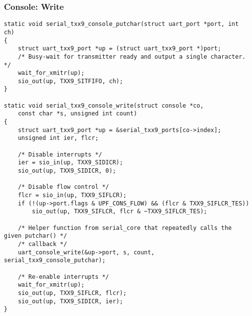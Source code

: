 \begin{frame}[fragile]
  \frametitle{Console: Write}
\begin{verbatim}
static void serial_txx9_console_putchar(struct uart_port *port, int ch)
{
	struct uart_txx9_port *up = (struct uart_txx9_port *)port;
	/* Busy-wait for transmitter ready and output a single character. */
	wait_for_xmitr(up);
	sio_out(up, TXX9_SITFIFO, ch);
}

static void serial_txx9_console_write(struct console *co,
    const char *s, unsigned int count)
{
    struct uart_txx9_port *up = &serial_txx9_ports[co->index];
    unsigned int ier, flcr;

    /* Disable interrupts */
    ier = sio_in(up, TXX9_SIDICR);
    sio_out(up, TXX9_SIDICR, 0);

    /* Disable flow control */
    flcr = sio_in(up, TXX9_SIFLCR);
    if (!(up->port.flags & UPF_CONS_FLOW) && (flcr & TXX9_SIFLCR_TES))
        sio_out(up, TXX9_SIFLCR, flcr & ~TXX9_SIFLCR_TES);

    /* Helper function from serial_core that repeatedly calls the given putchar() */
    /* callback */
    uart_console_write(&up->port, s, count, serial_txx9_console_putchar);

    /* Re-enable interrupts */
    wait_for_xmitr(up);
    sio_out(up, TXX9_SIFLCR, flcr);
    sio_out(up, TXX9_SIDICR, ier);
}
\end{verbatim}
\end{frame}
